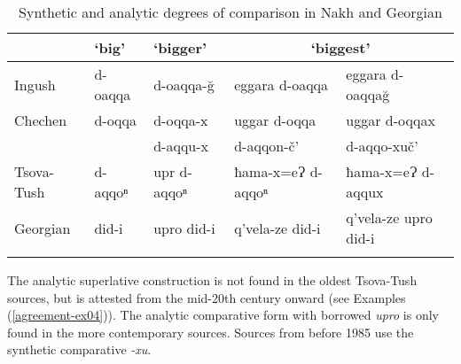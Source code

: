 
\begin{table}
\small
\begin{tabular}{lllll}
	\lsptoprule
	           & `big' & `bigger' & \multicolumn{2}{c}{`biggest'}\\\midrule
	Ingush     & d-oaqqa & d-oaqqa-\u{g} & eggara d-oaqqa & eggara d-oaqqa\u{g} \\
	Chechen    & d-oqqa  & d-oqqa-x      & uggar d-oqqa &  uggar d-oqqax\\
	           &         & d-aqqu-x      & d-aqqon-č' & d-aqqo-xuč'\\
	Tsova-Tush & d-aqqoⁿ & upr d-aqqoⁿ   & ħama-x=eɁ d-aqqoⁿ & ħama-x=eɁ d-aqqux\\
	Georgian   & did-i   & upro did-i    & q'vela-ze did-i & q'vela-ze upro did-i \\
	\lspbottomrule
\end{tabular}
\caption{Synthetic and analytic degrees of comparison in Nakh and Georgian}
\label{compsuperl}
\end{table}

The analytic superlative construction is not found in the oldest Tsova-Tush sources, but is attested from the mid-20th century onward (see Examples (\ref{agreement-ex04})). The analytic comparative form with borrowed \textit{upro} is only found in the more contemporary sources. Sources from before 1985 use the synthetic comparative \textit{-xu}.

